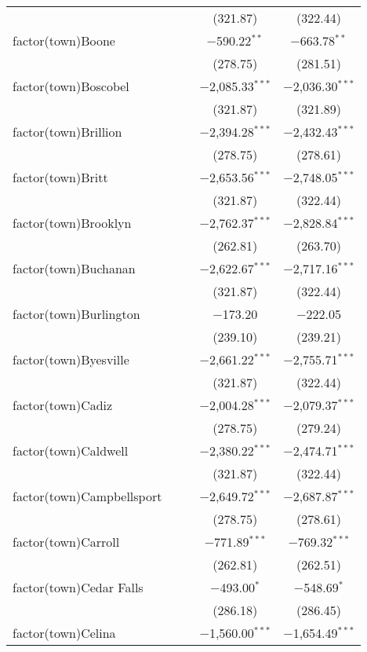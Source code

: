 \begin{table}[!htbp]
\begin{tabular}{@{\extracolsep{5pt}}lcccc}
  &  &  & (321.87) & (322.44) \\ 
  factor(town)Boone &  &  & $-$590.22$^{**}$ & $-$663.78$^{**}$ \\ 
  &  &  & (278.75) & (281.51) \\ 
  factor(town)Boscobel &  &  & $-$2,085.33$^{***}$ & $-$2,036.30$^{***}$ \\ 
  &  &  & (321.87) & (321.89) \\ 
  factor(town)Brillion &  &  & $-$2,394.28$^{***}$ & $-$2,432.43$^{***}$ \\ 
  &  &  & (278.75) & (278.61) \\ 
  factor(town)Britt &  &  & $-$2,653.56$^{***}$ & $-$2,748.05$^{***}$ \\ 
  &  &  & (321.87) & (322.44) \\ 
  factor(town)Brooklyn &  &  & $-$2,762.37$^{***}$ & $-$2,828.84$^{***}$ \\ 
  &  &  & (262.81) & (263.70) \\ 
  factor(town)Buchanan &  &  & $-$2,622.67$^{***}$ & $-$2,717.16$^{***}$ \\ 
  &  &  & (321.87) & (322.44) \\ 
  factor(town)Burlington &  &  & $-$173.20 & $-$222.05 \\ 
  &  &  & (239.10) & (239.21) \\ 
  factor(town)Byesville &  &  & $-$2,661.22$^{***}$ & $-$2,755.71$^{***}$ \\ 
  &  &  & (321.87) & (322.44) \\ 
  factor(town)Cadiz &  &  & $-$2,004.28$^{***}$ & $-$2,079.37$^{***}$ \\ 
  &  &  & (278.75) & (279.24) \\ 
  factor(town)Caldwell &  &  & $-$2,380.22$^{***}$ & $-$2,474.71$^{***}$ \\ 
  &  &  & (321.87) & (322.44) \\ 
  factor(town)Campbellsport &  &  & $-$2,649.72$^{***}$ & $-$2,687.87$^{***}$ \\ 
  &  &  & (278.75) & (278.61) \\ 
  factor(town)Carroll &  &  & $-$771.89$^{***}$ & $-$769.32$^{***}$ \\ 
  &  &  & (262.81) & (262.51) \\ 
  factor(town)Cedar Falls &  &  & $-$493.00$^{*}$ & $-$548.69$^{*}$ \\ 
  &  &  & (286.18) & (286.45) \\ 
  factor(town)Celina &  &  & $-$1,560.00$^{***}$ & $-$1,654.49$^{***}$ \\ 

\end{tabular}
\end{table}
